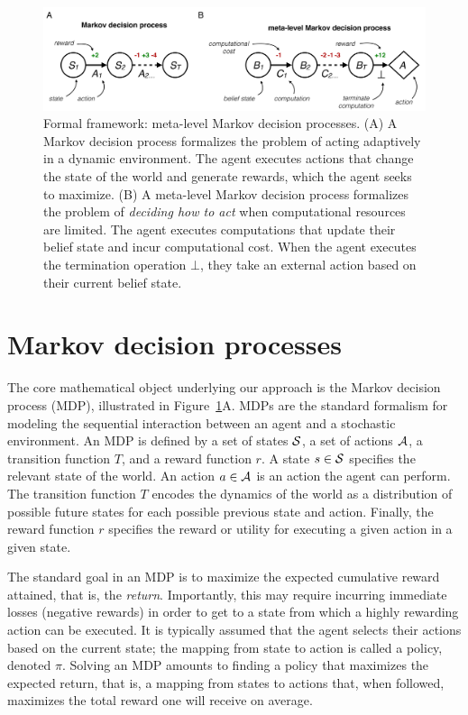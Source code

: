 \begin{figure}
  \includegraphics[width=\textwidth]{figs/metamdp.pdf}
  \caption{Formal framework: meta-level Markov decision processes.
  (A) A Markov decision process formalizes the problem of acting adaptively in a dynamic environment. The agent executes actions that change the state of the world and generate rewards, which the agent seeks to maximize.
  (B) A meta-level Markov decision process formalizes the problem of \emph{deciding how to act} when computational resources are limited. The agent executes computations that update their belief state and incur computational cost. When the agent executes the termination operation $\bot$, they take an external action based on their current belief state.}
  \label{fig:metamdp-diagram}
\end{figure}


\section{Markov decision processes}

The core mathematical object underlying our approach is the Markov decision process (MDP), illustrated in Figure~\ref{fig:metamdp-diagram}A. MDPs are the standard formalism for modeling the sequential interaction between an agent and a stochastic environment. An MDP is defined by a set of states $\S$, a set of actions $\A$, a transition function $T$, and a reward function $r$. A state $s \in \S$ specifies the relevant state of the world. An action $a \in \A$ is an action the agent can perform. The transition function $T$ encodes the dynamics of the world as a distribution of possible future states for each possible previous state and action. Finally, the reward function $r$ specifies the reward or utility for executing a given action in a given state.

The standard goal in an MDP is to maximize the expected cumulative reward attained, that is, the \emph{return}. Importantly, this may require incurring immediate losses (negative rewards) in order to get to a state from which a highly rewarding action can be executed. It is typically assumed that the agent selects their actions based on the current state; the mapping from state to action is called a policy, denoted $\pi$. Solving an MDP amounts to finding a policy that maximizes the expected return, that is, a mapping from states to actions that, when followed, maximizes the total reward one will receive on average.

